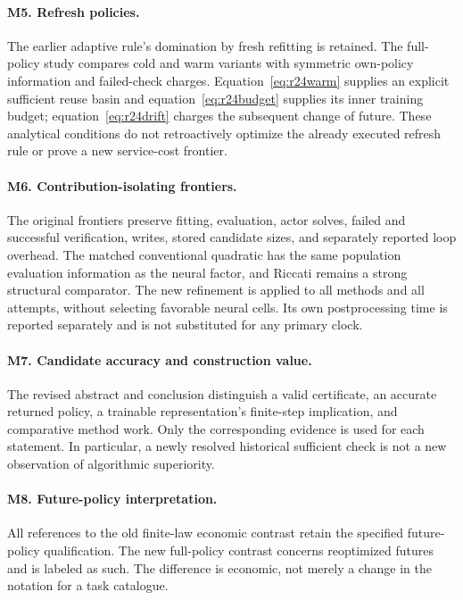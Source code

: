 \paragraph{M5. Refresh policies.}
The earlier adaptive rule's domination by fresh refitting is retained.
The full-policy study compares cold and warm variants with symmetric own-policy
information and failed-check charges. Equation~\eqref{eq:r24warm} supplies
an explicit sufficient reuse basin and equation~\eqref{eq:r24budget} supplies
its inner training budget; equation~\eqref{eq:r24drift} charges the subsequent
change of future. These analytical conditions do not retroactively optimize
the already executed refresh rule or prove a new service-cost frontier.

\paragraph{M6. Contribution-isolating frontiers.}
The original frontiers preserve fitting, evaluation, actor solves, failed
and successful verification, writes, stored candidate sizes, and separately
reported loop overhead. The matched conventional quadratic has the same
population evaluation information as the neural factor, and Riccati remains
a strong structural comparator. The new refinement is applied to all methods
and all attempts, without selecting favorable neural cells. Its own
postprocessing time is reported separately and is not substituted for any
primary clock.

\paragraph{M7. Candidate accuracy and construction value.}
The revised abstract and conclusion distinguish a valid certificate, an
accurate returned policy, a trainable representation's finite-step implication,
and comparative method work. Only the corresponding evidence is used for
each statement. In particular, a newly resolved historical sufficient check
is not a new observation of algorithmic superiority.

\paragraph{M8. Future-policy interpretation.}
All references to the old finite-law economic contrast retain the specified
future-policy qualification. The new full-policy contrast concerns
reoptimized futures and is labeled as such. The difference is economic, not
merely a change in the notation for a task catalogue.

